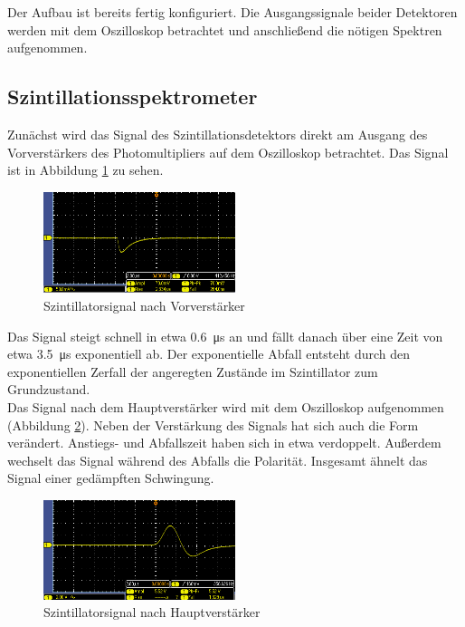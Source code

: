 Der Aufbau ist bereits fertig konfiguriert. Die Ausgangssignale beider Detektoren werden mit dem Oszilloskop betrachtet und anschließend die nötigen Spektren aufgenommen. 

\subsection{Szintillationsspektrometer}
Zunächst wird das Signal des Szintillationsdetektors direkt am Ausgang des Vorverstärkers des Photomultipliers auf dem Oszilloskop betrachtet. Das Signal ist in Abbildung \ref{fig:szint_nach_vorv} zu sehen.
\begin{figure}[h]
  \centering
  \includegraphics[width=0.5\textwidth]{data/raw/szint_nach_vorv.png}
  \caption{Szintillatorsignal nach Vorverstärker}
  \label{fig:szint_nach_vorv}
\end{figure}

Das Signal steigt schnell in etwa \SI{0.6}{\micro\second} an und fällt danach über eine Zeit von etwa \SI{3.5}{\micro\second} exponentiell ab. Der exponentielle Abfall entsteht durch den exponentiellen Zerfall der angeregten Zustände im Szintillator zum Grundzustand.\\

Das Signal nach dem Hauptverstärker wird mit dem Oszilloskop aufgenommen (Abbildung \ref{fig:szint_nach_haupt}). Neben der Verstärkung des Signals hat sich auch die Form verändert. Anstiegs- und Abfallszeit haben sich in etwa verdoppelt. Außerdem wechselt das Signal während des Abfalls die Polarität. Insgesamt ähnelt das Signal einer gedämpften Schwingung.\\ 
\begin{figure}[h]
  \centering
  \includegraphics[width=0.5\textwidth]{data/raw/szint_nach_haupt.png}
  \caption{Szintillatorsignal nach Hauptverstärker}
  \label{fig:szint_nach_haupt}
\end{figure}


